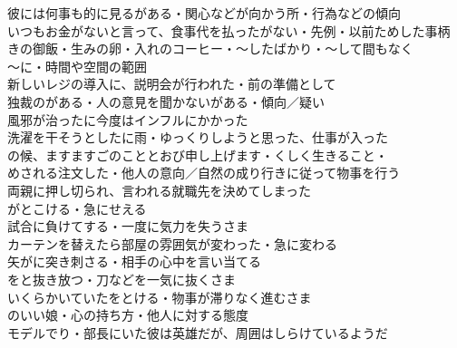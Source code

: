 彼には何事も的に見るがある・関心などが向かう所・行為などの傾向\\
いつもお金がないと言って、食事代を払ったがない・先例・以前ためした事柄\\
きの御飯・生みの卵・入れのコーヒー・〜したばかり・〜して間もなく\\

〜に・時間や空間の範囲\\
新しいレジの導入に、説明会が行われた・前の準備として\\
独裁のがある・人の意見を聞かないがある・傾向／疑い\\

風邪が治ったに今度はインフルにかかった\\
洗濯を干そうとしたに雨・ゆっくりしようと思った、仕事が入った\\
の候、ますますごのこととおび申し上げます・くしく生きること・\\

めされる注文した・他人の意向／自然の成り行きに従って物事を行う\\
両親に押し切られ、言われる就職先を決めてしまった\\

がとこける・急にせえる\\
試合に負けてする・一度に気力を失うさま\\
カーテンを替えたら部屋の雰囲気が変わった・急に変わる\\
矢がに突き刺さる・相手の心中を言い当てる\\
をと抜き放つ・刀などを一気に抜くさま\\
いくらかいていたをとける・物事が滞りなく進むさま\\

のいい娘・心の持ち方・他人に対する態度\\
モデルでり・部長にいた彼は英雄だが、周囲はしらけているようだ\\

